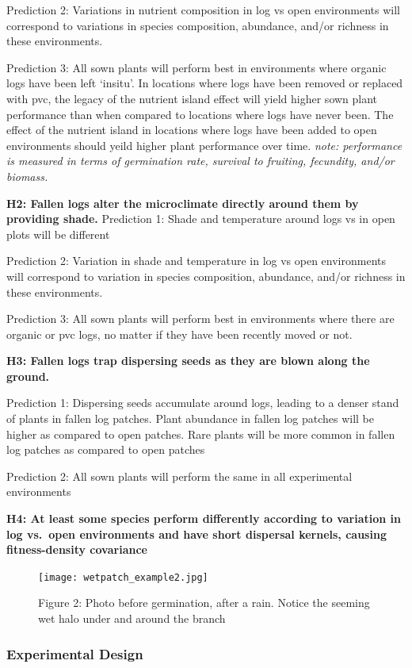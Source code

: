 \documentclass[
]{article}
\begin{document}
Prediction 2: Variations in nutrient composition in log vs open
environments will correspond to variations in species composition,
abundance, and/or richness in these environments.

Prediction 3: All sown plants will perform best in environments where
organic logs have been left `insitu'. In locations where logs have been
removed or replaced with pvc, the legacy of the nutrient island effect
will yield higher sown plant performance than when compared to locations
where logs have never been. The effect of the nutrient island in
locations where logs have been added to open environments should yeild
higher plant performance over time. \emph{note: performance is measured
in terms of germination rate, survival to fruiting, fecundity, and/or
biomass.}

\textbf{H2: Fallen logs alter the microclimate directly around them by
providing shade.} Prediction 1: Shade and temperature around logs vs in
open plots will be different

Prediction 2: Variation in shade and temperature in log vs open
environments will correspond to variation in species composition,
abundance, and/or richness in these environments.

Prediction 3: All sown plants will perform best in environments where
there are organic or pvc logs, no matter if they have been recently
moved or not.

\textbf{H3: Fallen logs trap dispersing seeds as they are blown along
the ground.}

Prediction 1: Dispersing seeds accumulate around logs, leading to a
denser stand of plants in fallen log patches. Plant abundance in fallen
log patches will be higher as compared to open patches. Rare plants will
be more common in fallen log patches as compared to open patches

Prediction 2: All sown plants will perform the same in all experimental
environments

\textbf{H4: At least some species perform differently according to
variation in log vs.~open environments and have short dispersal kernels,
causing fitness-density covariance}

\begin{figure}
\centering
\texttt{[image: wetpatch\_example2.jpg]}
\caption{Figure 2: Photo before germination, after a rain. Notice the
seeming wet halo under and around the branch}
\end{figure}

\hypertarget{experimental-design}{%
\subsubsection{Experimental Design}\label{experimental-design}}
\end{document}
